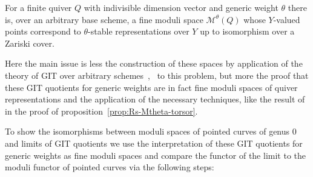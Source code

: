 \documentclass[ALCO,ThmDefs,Unicode,epreuves]{cedram}
\begin{document}
\begin{theo*}
For a finite quiver $Q$ with indivisible dimension vector 
and generic weight $\theta$ there is, over an arbitrary base scheme, a fine moduli 
space $\mathcal M^\theta(Q)$ whose $Y$-valued points correspond to $\theta$-stable
representations over $Y$ up to isomorphism over a Zariski cover.
\end{theo*}


Here the main issue is less the construction of these spaces by application 
of the theory of GIT over arbitrary schemes~\cite{Al14},~\cite{Ses77} to this 
problem, but more the proof that these GIT quotients for generic weights are 
in fact fine moduli spaces of quiver representations and the application of 
the necessary techniques, like the result of~\cite{An73} in the proof of 
proposition~\ref{prop:Rs-Mtheta-torsor}.


To show the isomorphisms between moduli spaces of pointed curves of genus $0$
and limits of GIT quotients we use the interpretation of these GIT quotients 
for generic weights as fine moduli spaces and compare the functor of the limit 
to the moduli functor of pointed curves via the following steps:
\end{document}
